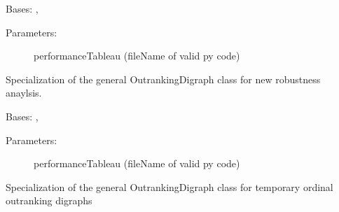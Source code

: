 \documentclass[letterpaper,10pt,english]{sphinxmanual}
\begin{document}
\begin{fulllineitems}
\label{techDoc:outrankingDigraphs.NewRobustOutrankingDigraph}
Bases: {\hyperref[techDoc:outrankingDigraphs.BipolarOutrankingDigraph]{\emph{}}}, {\hyperref[techDoc:perfTabs.PerformanceTableau]{\emph{}}}
\begin{description}
\item[{Parameters:}] \leavevmode
performanceTableau (fileName of valid py code)

\end{description}

Specialization of the general OutrankingDigraph class for 
new robustness anaylsis.

\end{fulllineitems}


\begin{fulllineitems}
\label{techDoc:outrankingDigraphs.OrdinalOutrankingDigraph}
Bases: {\hyperref[techDoc:outrankingDigraphs.OutrankingDigraph]{\emph{}}}, {\hyperref[techDoc:perfTabs.PerformanceTableau]{\emph{}}}
\begin{description}
\item[{Parameters:}] \leavevmode
performanceTableau (fileName of valid py code)

\end{description}

Specialization of the general OutrankingDigraph class for 
temporary ordinal outranking digraphs

\end{fulllineitems}

\end{document}
